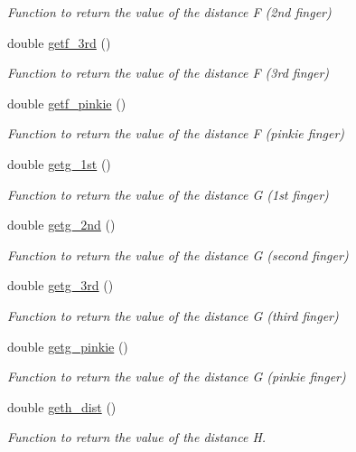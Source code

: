 \begin{DoxyCompactItemize}
\begin{DoxyCompactList}\small\item\em Function to return the value of the distance F (2nd finger) \end{DoxyCompactList}\item 
double \hyperlink{classFullhand__dist_a02809d5b6d79135c65c94be7d0130a7c}{getf\_\-3rd} ()
\begin{DoxyCompactList}\small\item\em Function to return the value of the distance F (3rd finger) \end{DoxyCompactList}\item 
double \hyperlink{classFullhand__dist_a3349fbee253b8503d8628212d3c8857a}{getf\_\-pinkie} ()
\begin{DoxyCompactList}\small\item\em Function to return the value of the distance F (pinkie finger) \end{DoxyCompactList}\item 
double \hyperlink{classFullhand__dist_a684a991b8ab630647722d6d5d6c3ac41}{getg\_\-1st} ()
\begin{DoxyCompactList}\small\item\em Function to return the value of the distance G (1st finger) \end{DoxyCompactList}\item 
double \hyperlink{classFullhand__dist_ac04c9597fbab43933971284cd2426d0d}{getg\_\-2nd} ()
\begin{DoxyCompactList}\small\item\em Function to return the value of the distance G (second finger) \end{DoxyCompactList}\item 
double \hyperlink{classFullhand__dist_a8fdfefaa79363991c61f152c4e6ca482}{getg\_\-3rd} ()
\begin{DoxyCompactList}\small\item\em Function to return the value of the distance G (third finger) \end{DoxyCompactList}\item 
double \hyperlink{classFullhand__dist_ad339f415807c40ada9d3708103d8b069}{getg\_\-pinkie} ()
\begin{DoxyCompactList}\small\item\em Function to return the value of the distance G (pinkie finger) \end{DoxyCompactList}\item 
double \hyperlink{classFullhand__dist_a420a0d0de22eab9c6f846f4779d0bb40}{geth\_\-dist} ()
\begin{DoxyCompactList}\small\item\em Function to return the value of the distance H. \end{DoxyCompactList}\end{DoxyCompactItemize}
